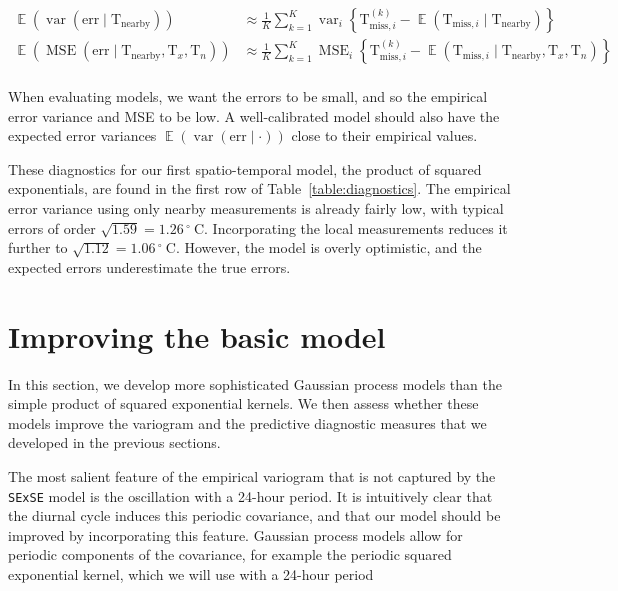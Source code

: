 \documentclass[letter]{article}
\newcommand{\genericdel}[3]{%
      \left#1#3\right#2
    }
\newcommand{\del}[1]{\genericdel(){#1}}
\newcommand{\cbr}[1]{\genericdel\{\}{#1}}
\DeclareMathOperator{\E}{\mathbb{E}}
\DeclareMathOperator{\var}{{var}}
\DeclareMathOperator{\mse}{{MSE}}
\newcommand{\T}{\mathrm{T}}
\newcommand{\Tn}{\T_{n}}
\newcommand{\Tx}{\T_{x}}
\newcommand{\degreeC}{{}^{\circ}~\mathrm{C}}
\newcommand{\miss}{\mathrm{miss}}
\newcommand{\obs}{\mathrm{nearby}}
\newcommand{\error}{\mathrm{err}}
\begin{document}
\begin{equation}
\begin{split}
    \E \del{\var\del{\error \mid \T_\obs}} &\approx \frac{1}{K} \sum_{k=1}^K \var_i \cbr{\T^{(k)}_{\miss,i} - \E\del{\T_{\miss,i} \mid \T_\obs}} \\
    \E \del{\mse\del{\error \mid \T_\obs,\Tx,\Tn}} &\approx \frac{1}{K} \sum_{k=1}^K \mse_i \cbr{\T^{(k)}_{\miss,i} - \E\del{\T_{\miss,i} \mid \T_\obs,\Tx,\Tn}} \\
\end{split}
\end{equation}

When evaluating models, we want the errors to be small, and so the empirical error variance and MSE to be low. A well-calibrated model should also have the expected error variances \(\E \del{\var\del{\error \mid \cdot}}\) close to their empirical values.

These diagnostics for our first spatio-temporal model, the product of squared exponentials, are found in the first row of Table~\ref{table:diagnostics}. The empirical error variance using only nearby measurements is already fairly low, with typical errors of order \(\sqrt{1.59}=1.26\,\degreeC\). Incorporating the local measurements reduces it further to \(\sqrt{1.12}=1.06\,\degreeC\). However, the model is overly optimistic, and the expected errors underestimate the true errors.
    


        \section{Improving the basic model}\label{improving-the-basic-model}
    

\label{sec:improving_model}
        In this section, we develop more sophisticated Gaussian process models than the simple product of squared exponential kernels. We then assess whether these models improve the variogram and the predictive diagnostic measures that we developed in the previous sections.

The most salient feature of the empirical variogram that is not captured by the \texttt{SExSE} model is the oscillation with a 24-hour period.
It is intuitively clear that the diurnal cycle induces this periodic covariance, and that our model should be improved by incorporating this feature.
Gaussian process models allow for periodic components of the covariance, for example the periodic squared exponential kernel, which we will use with a 24-hour period
\end{document}
